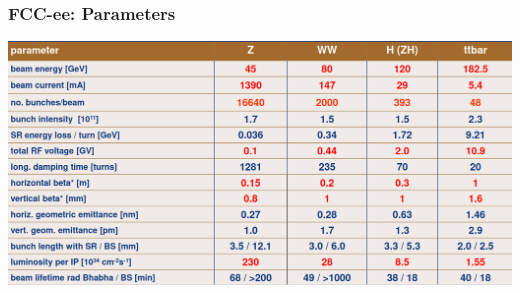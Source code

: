 \documentclass[aspectratio=169]{beamer}
\begin{document}
\begin{frame}
    \frametitle{FCC-ee: Parameters}
    \includegraphics[width=1.0\linewidth]{figures/parameters-fccee.png}\\
\end{frame}
\end{document}
